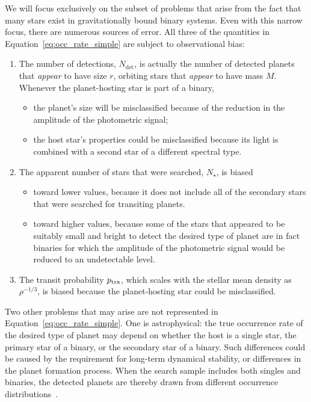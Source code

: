 \documentclass[12pt,modern]{aastex61}
\begin{document}
We will focus exclusively on the subset of problems that arise from
the fact that many stars exist in gravitationally bound binary
systems.  Even with this narrow focus, there are numerous sources of
error.  All three of the quantities in
Equation~\ref{eq:occ_rate_simple} are subject to
observational bias:
\begin{enumerate}
%    
    \item The number of detections, $N_{\det}$, is actually the number of 
    detected planets that {\it appear} to have size $r$, orbiting stars that 
    {\it appear} to have mass $M$.
    Whenever the planet-hosting star is part of a binary,
%    
    \begin{itemize}
        \item the planet's size will be misclassified because of the reduction
        in the amplitude of the photometric signal;
%        
        \item the host star's properties could be misclassified because its 
        light is combined with a second star of a different spectral type.
%        
    \end{itemize}
%    
    \item The apparent number of stars that were searched, $N_\star$,
    is biased
%    
    \begin{itemize}
%        
        \item toward lower values, because it does not include all of the
        secondary stars that were searched for transiting planets.
%        
        \item toward higher values, because some of the stars that
        appeared to be suitably small and bright to detect the desired
        type of planet are in fact binaries for which the amplitude of
        the photometric signal would be reduced to an undetectable
        level.
%        
    \end{itemize}
%    
    \item The transit probability $p_{\rm tra}$, which scales with the
    stellar mean density as $\rho^{-1/3}$, is biased because the
    planet-hosting star could be misclassified.
%    
\end{enumerate}

Two other problems that may arise are not represented in
Equation~\ref{eq:occ_rate_simple}.  One is astrophysical:
the true occurrence rate of the desired type of planet may depend on
whether the host is a single star, the primary star of a binary, or
the secondary star of a binary.  Such differences could be caused by
the requirement for long-term dynamical stability, or differences in
the planet formation process.  When the search sample includes both
singles and binaries, the detected planets are thereby drawn from
different occurrence distributions~\citep[see,
{\it e.g.},][]{wang_occurrence_2015}.
\end{document}
